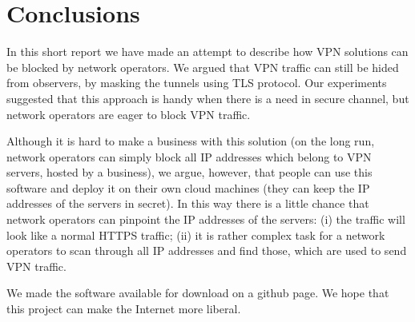 \section{Conclusions}
\label{section:conclusion}

In this short report we have made an attempt to describe how VPN solutions
can be blocked by network operators. We argued that VPN traffic can still be
hided from observers, by masking the tunnels using TLS protocol. 
Our experiments suggested that this approach is handy when there is a need
in secure channel, but network operators are eager to block VPN traffic.

Although it is hard to make a business with this solution (on the long
run, network operators can simply block all IP addresses which belong to VPN servers,
hosted by a business), we argue, however, that people can use this software
and deploy it on their own cloud machines (they can keep the IP addresses 
of the servers in secret). In this way there is a little chance
that network operators can pinpoint the IP addresses of the servers: (i)
the traffic will look like a normal HTTPS traffic; (ii) it is rather complex task
for a network operators to scan through all IP addresses and find those, which 
are used to send VPN traffic.

We made the software available for download on a github page. We hope that 
this project can make the Internet more liberal.